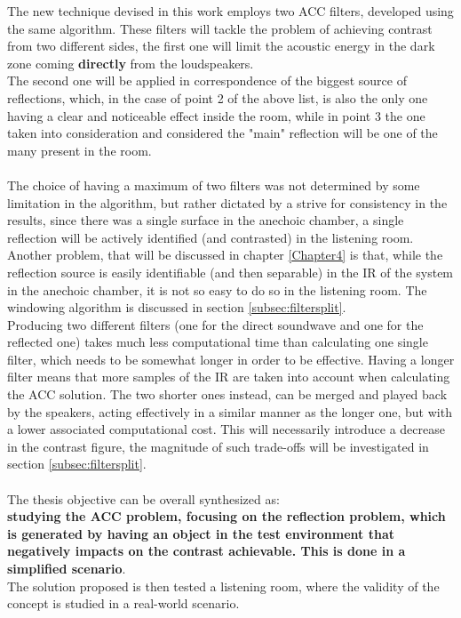 The new technique devised in this work employs two ACC filters, developed using the same algorithm. These filters will tackle the problem of achieving contrast from two different sides, the first one will limit the acoustic energy in the dark zone coming \textbf{directly} from the loudspeakers.
\\
The second one will be applied in correspondence of the biggest source of reflections, which, in the case of point 2 of the above list, is also the only one having a clear and noticeable effect inside the room, while in point 3 the one taken into consideration and considered the "main" reflection will be one of the many present in the room.
\\
\\
The choice of having a maximum of two filters was not determined by some limitation in the algorithm, but rather dictated by a strive for consistency in the results, since there was a single surface in the anechoic chamber, a single reflection will be actively identified (and contrasted) in the listening room. Another problem, that will be discussed in chapter \ref{Chapter4} is that, while the reflection source is easily identifiable (and then separable) in the IR of the system in the anechoic chamber, it is not so easy to do so in the listening room. The windowing algorithm is discussed in section \ref{subsec:filtersplit}.
\\
Producing two different filters (one for the direct soundwave and one for the reflected one) takes much less computational time than calculating one single filter, which needs to be somewhat longer in order to be effective. Having a longer filter means that more samples of the IR are taken into account when calculating the ACC solution. The two shorter ones instead, can be merged and played back by the speakers, acting effectively in a similar manner as the longer one, but with a lower associated computational cost. This will necessarily introduce a decrease in the contrast figure, the magnitude of such trade-offs will be investigated in section \ref{subsec:filtersplit}.
\\
\\
The thesis objective can be overall synthesized as:
\\
\textbf{studying the ACC problem, focusing on the reflection problem, which is generated by having an object in the test environment that negatively impacts on the contrast achievable. This is done in a simplified scenario}.
\\
The solution proposed is then tested a listening room, where the validity of the concept is studied in a real-world scenario.
